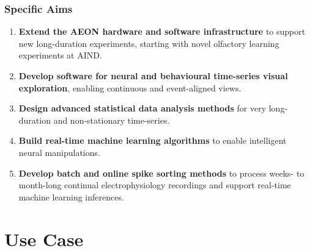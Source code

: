 \documentclass{beamer}
\begin{document}
\begin{frame}
    \frametitle{Specific Aims}

    \begin{enumerate}

        \item \textbf{Extend the AEON hardware and software infrastructure} to
            support new long-duration experiments, starting with novel
            olfactory learning experiments at AIND.

        \item \textbf{Develop software for neural and behavioural time-series
            visual exploration}, enabling continuous and event-aligned views.

        \item \textbf{Design advanced statistical data analysis methods} for very
            long-duration and non-stationary time-series.

        \item \textbf{Build real-time machine learning algorithms} to
            enable intelligent neural manipulations.

        \item \textbf{Develop batch and online spike sorting methods} to
            process weeks- to month-long continual electrophysiology recordings
            and support real-time machine learning inferences.

    \end{enumerate}

\end{frame}

\section{Use Case}
\end{document}

